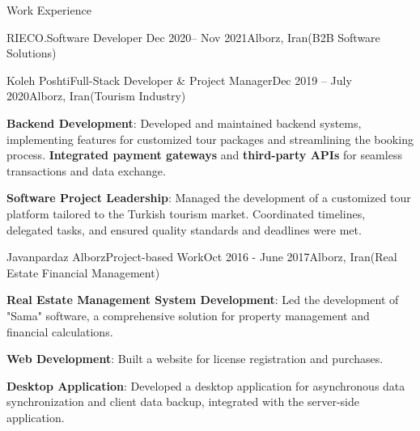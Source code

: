 \documentclass[]{kyvernitis-resume}
\begin{document}
\begin{section}{Work Experience}
\begin{subsection}{RIECO.}{Software Developer }{Dec 2020-- Nov 2021}{Alborz, Iran}{(B2B Software Solutions)}
    \end{subsection}
    
    \begin{subsection}{Koleh Poshti}{Full-Stack Developer \& Project Manager}{Dec 2019 -- July 2020}{Alborz, Iran}{(Tourism Industry)}

        	\item \textbf{Backend Development}: Developed and maintained backend systems, implementing features for customized tour packages and streamlining the booking process. \textbf{Integrated payment gateways} and \textbf{third-party APIs} for seamless transactions and data exchange.
        	\item \textbf{Software Project Leadership}: Managed the development of a customized tour platform tailored to the Turkish tourism market. Coordinated timelines, delegated tasks, and ensured quality standards and deadlines were met.
    \end{subsection}


    \begin{subsection}{Javanpardaz Alborz}{Project-based Work}{Oct 2016 - June 2017}{Alborz, Iran}{(Real Estate Financial Management)}
	\item \textbf{Real Estate Management System Development}: Led the development of "Sama" software, a comprehensive solution for property management and financial calculations.
	\item \textbf{Web Development}: Built a 
website for license registration and purchases.
	\item \textbf{Desktop Application}: Developed a 
desktop application for asynchronous data synchronization and client data backup, integrated with the server-side application.

    \end{subsection}



\end{section}
\end{document}
